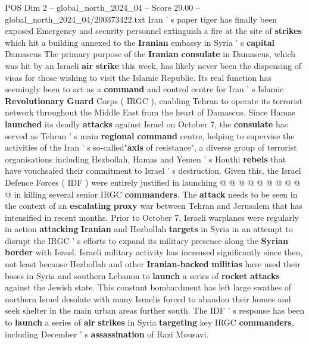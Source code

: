 \begin{textsample}{POS Dim 2 – global\_north\_2024\_04 – Score 29.00 – global\_north\_2024\_04/200373422.txt}  \label{ex:f2_pos_164}
Iran ' s paper tiger has finally been exposed Emergency and security personnel extinguish a fire at the site of \textbf{strikes} which hit a building annexed to the \textbf{Iranian} embassy in Syria ' s \textbf{capital} Damascus The primary purpose of the \textbf{Iranian} \textbf{consulate} in Damascus, which was hit by an Israeli \textbf{air} \textbf{strike} this week, has likely never been the dispensing of visas for those wishing to visit the Islamic Republic.
Its real function has seemingly been to act as a \textbf{command} and control centre for Iran ' s Islamic \textbf{Revolutionary} \textbf{Guard} Corps ( IRGC ), enabling Tehran to operate its terrorist network throughout the Middle East from the heart of Damascus.
Since Hamas \textbf{launched} its deadly \textbf{attacks} against Israel on October 7, the \textbf{consulate} has served as Tehran ' s main \textbf{regional} \textbf{command} centre, helping to supervise the activities of the Iran ' s so-called"\textbf{axis} of resistance", a diverse group of terrorist organisations including Hezbollah, Hamas and Yemen ' s Houthi \textbf{rebels} that have vouchsafed their commitment to Israel ' s destruction.
Given this, the Israel Defence Forces ( IDF ) were entirely justified in launching @ @ @ @ @ @ @ @ @ @ in killing several senior IRGC \textbf{commanders}.
The \textbf{attack} needs to be seen in the context of an \textbf{escalating} \textbf{proxy} war between Tehran and Jerusalem that has intensified in recent months.
Prior to October 7, Israeli warplanes were regularly in action \textbf{attacking} \textbf{Iranian} and Hezbollah \textbf{targets} in Syria in an attempt to disrupt the IRGC ' s efforts to expand its military presence along the \textbf{Syrian} \textbf{border} with Israel.
Israeli military activity has increased significantly since then, not least because Hezbollah and other \textbf{Iranian-backed} \textbf{militias} have used their bases in Syria and southern Lebanon to \textbf{launch} a series of \textbf{rocket} \textbf{attacks} against the Jewish state.
This constant bombardment has left large swathes of northern Israel desolate with many Israelis forced to abandon their homes and seek shelter in the main urban areas further south.
The IDF ' s response has been to \textbf{launch} a series of \textbf{air} \textbf{strikes} in Syria \textbf{targeting} key IRGC \textbf{commanders}, including December ' s \textbf{assassination} of Razi Mousavi.

\end{textsample}
